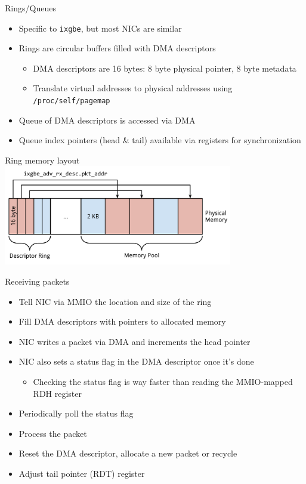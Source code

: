 \documentclass[NET,english,aspectratio=169]{tumbeamer}
\begin{document}
\begin{frame}{Rings/Queues}
\begin{itemize}
\item Specific to \texttt{ixgbe}, but most NICs are similar
\item Rings are circular buffers filled with DMA descriptors
\begin{itemize}
\item DMA descriptors are 16 bytes: 8 byte physical pointer, 8 byte metadata
\item Translate virtual addresses to physical addresses using \texttt{/proc/self/pagemap}
\end{itemize}
\vspace{1em}
\item<2-> Queue of DMA descriptors is accessed via DMA
\item<2-> Queue index pointers (head \& tail) available via registers for synchronization
\end{itemize}
\end{frame}

\begin{frame}{Ring memory layout}
\centering\hspace{1cm}\includegraphics[width=0.75\textwidth]{pics/ring}
\end{frame}

\begin{frame}{Receiving packets}
\begin{itemize}
\item Tell NIC via MMIO the location and size of the ring
\item Fill DMA descriptors with pointers to allocated memory
\end{itemize}
\pause
\begin{itemize}
\item NIC writes a packet via DMA and increments the head pointer
\item NIC also sets a status flag in the DMA descriptor once it's done
\begin{itemize}
\item Checking the status flag is way faster than reading the MMIO-mapped RDH register
\end{itemize}
\pause
\item Periodically poll the status flag
\item Process the packet
\item Reset the DMA descriptor, allocate a new packet or recycle
\item Adjust tail pointer (RDT) register
\end{itemize}
\end{frame}
\end{document}
